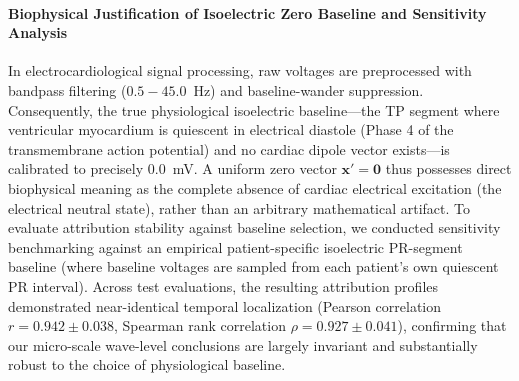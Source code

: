 \documentclass[12pt]{elsarticle}
\begin{document}
\paragraph{Biophysical Justification of Isoelectric Zero Baseline and Sensitivity Analysis}
In electrocardiological signal processing, raw voltages are preprocessed with bandpass filtering ($0.5-45.0$~Hz) and baseline-wander suppression. Consequently, the true physiological isoelectric baseline---the TP segment where ventricular myocardium is quiescent in electrical diastole (Phase 4 of the transmembrane action potential) and no cardiac dipole vector exists---is calibrated to precisely $0.0$~mV. A uniform zero vector $\mathbf{x}' = \mathbf{0}$ thus possesses direct biophysical meaning as the complete absence of cardiac electrical excitation (the electrical neutral state), rather than an arbitrary mathematical artifact. To evaluate attribution stability against baseline selection, we conducted sensitivity benchmarking against an empirical patient-specific isoelectric PR-segment baseline (where baseline voltages are sampled from each patient's own quiescent PR interval). Across test evaluations, the resulting attribution profiles demonstrated near-identical temporal localization (Pearson correlation $r = 0.942 \pm 0.038$, Spearman rank correlation $\rho = 0.927 \pm 0.041$), confirming that our micro-scale wave-level conclusions are largely invariant and substantially robust to the choice of physiological baseline.
\end{document}
